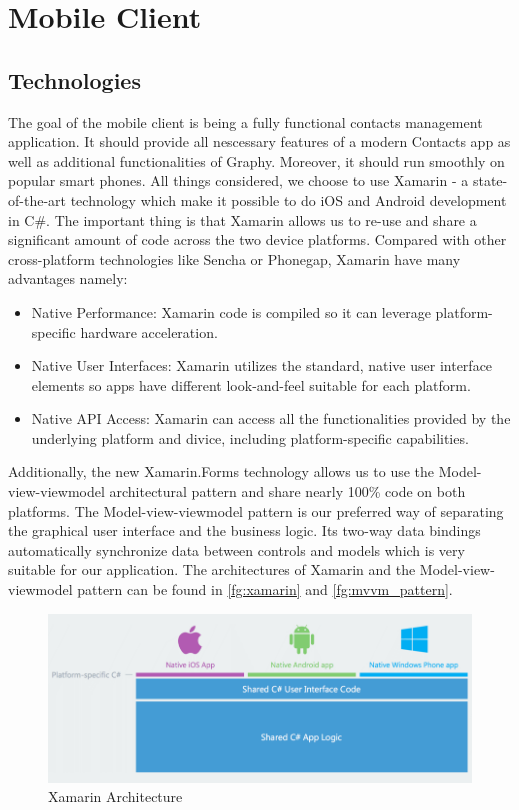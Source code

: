 \section{Mobile Client}
\subsection{Technologies}
The goal of the mobile client is being a fully functional contacts management application. It should provide all nescessary features of a modern Contacts app as well as additional functionalities of Graphy. Moreover, it should run smoothly on popular smart phones. All things considered, we choose to use Xamarin - a state-of-the-art technology which make it possible to do iOS and Android development in C\#. The important thing is that Xamarin allows us to re-use and share a significant amount of code across the two device platforms. Compared with other cross-platform technologies like Sencha or Phonegap, Xamarin have many advantages namely:

\begin{itemize}
\item Native Performance: Xamarin code is compiled so it can leverage platform-specific hardware acceleration.
\item Native User Interfaces: Xamarin utilizes the standard, native user interface elements so apps have different look-and-feel suitable for each platform.
\item Native API Access: Xamarin can access all the functionalities provided by the underlying platform and divice, including platform-specific capabilities.
\end{itemize}

Additionally, the new Xamarin.Forms technology allows us to use the Model-view-viewmodel architectural pattern and share nearly 100\% code on both platforms. The Model-view-viewmodel pattern is our preferred way of separating the graphical user interface and the business logic. Its two-way data bindings automatically synchronize data between controls and models which is very suitable for our application. The architectures of Xamarin and the Model-view-viewmodel pattern can be found in \autoref{fg:xamarin} and \autoref{fg:mvvm_pattern}.

\begin{figure}[!h]
\begin{centering}
\includegraphics[scale=0.55]{pics/xamarin.png}
\caption{Xamarin Architecture}\label{fg:xamarin}
\end{centering}
\end{figure}


